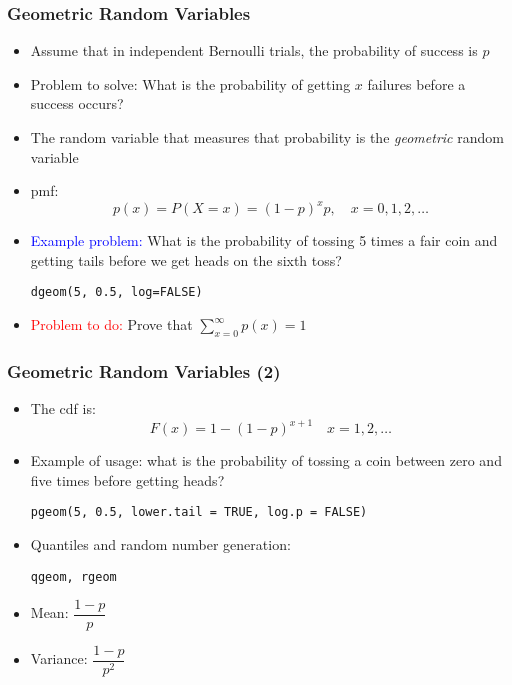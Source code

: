 \documentclass[10pt]{beamer}
\theoremstyle{definition}
\begin{document}
\begin{frame}[fragile]
\frametitle{Geometric Random Variables}
\begin{itemize}
	\item Assume that in independent Bernoulli trials, the probability of success is $ p $
	
	\item Problem to solve: What is the probability of getting $ x $ failures before a success occurs?
		
	\item The random variable that measures that probability is the \textit{geometric} random variable
		
	\item pmf:
	\[
		p(x) = P(X = x) = (1 - p)^{x}p, \quad x = 0, 1, 2, \ldots
	\]
		
	\item \textcolor{blue}{Example problem:} What is the probability of tossing 5 times a fair coin and getting tails before we get heads on the sixth toss?
	\begin{lstlisting}[style = rstyle, breaklines]
	dgeom(5, 0.5, log=FALSE)
	\end{lstlisting} 
	
	\item \textcolor{red}{Problem to do:} Prove that $ \displaystyle\sum_{x = 0}^{\infty} p(x) = 1$
\end{itemize}
\end{frame}

\begin{frame}[fragile]
\frametitle{Geometric Random Variables (2)}
\begin{itemize}
	\item The cdf is:
	\[
		F(x) = 1 - (1 - p)^{x+1}\quad x = 1,2,\ldots
	\]

	\item Example of usage: what is the probability of tossing a coin between zero and five times before getting heads?
	\begin{lstlisting}[style = rstyle, breaklines]
	pgeom(5, 0.5, lower.tail = TRUE, log.p = FALSE)
	\end{lstlisting}
	\item Quantiles and random number generation:
	\begin{lstlisting}[style = rstyle, breaklines]
	qgeom, rgeom
	\end{lstlisting} 
	
	\item Mean: $ \dfrac{1 - p}{p} $
		
	\item Variance: $ \dfrac{1 - p}{p^{2}} $
\end{itemize}
\end{frame}
\end{document}
